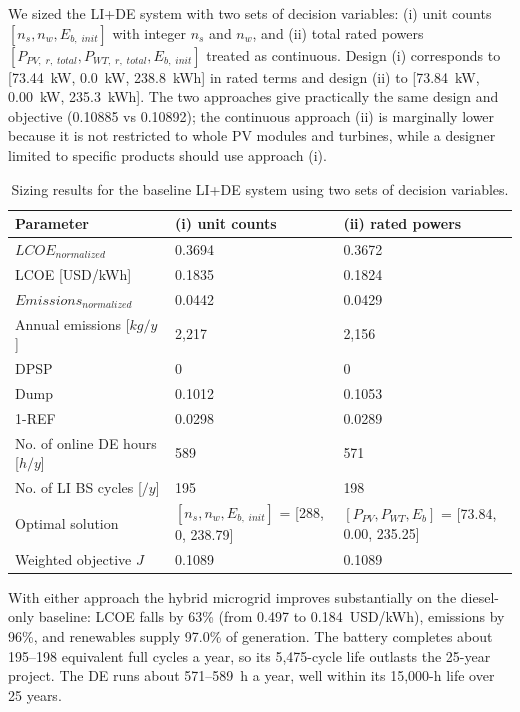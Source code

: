 \documentclass[final,3p,times]{elsarticle}
\begin{document}
We sized the LI+DE system with two sets of decision variables: (i) unit counts $[n_s, n_w, E_{b,\;init}]$ with integer $n_s$ and $n_w$, and (ii) total rated powers $[P_{PV,\;r,\;total}, P_{WT,\;r,\;total}, E_{b,\;init}]$ treated as continuous. Design (i) corresponds to [73.44~kW, 0.0~kW, 238.8~kWh] in rated terms and design (ii) to [73.84~kW, 0.00~kW, 235.3~kWh]. The two approaches give practically the same design and objective (0.10885 vs 0.10892); the continuous approach (ii) is marginally lower because it is not restricted to whole PV modules and turbines, while a designer limited to specific products should use approach (i).

\begin{table}[htbp]
\centering
\begin{tabular}{p{5cm} p{4.3cm} p{4.3cm}}
\toprule
\multicolumn{1}{l}{\textbf{Parameter}} & \multicolumn{1}{l}{(i) unit counts} & \multicolumn{1}{l}{(ii) rated powers} \\
\midrule
$LCOE_{normalized}$ & 0.3694 & 0.3672 \\
LCOE [USD/kWh] & 0.1835 & 0.1824 \\
$Emissions_{normalized}$ & 0.0442 & 0.0429 \\
Annual emissions [$kg/y$] & 2,217 & 2,156 \\
DPSP & 0 & 0 \\
Dump & 0.1012 & 0.1053 \\
1-REF & 0.0298 & 0.0289 \\
No. of online DE hours [$h/y$] & 589 & 571 \\
No. of LI BS cycles [$/y$] & 195 & 198 \\
Optimal solution & $[n_s, n_w, E_{b,\; init}]$ = [288, 0, 238.79] & $[P_{PV}, P_{WT}, E_{b}]$ = [73.84, 0.00, 235.25] \\
Weighted objective $J$ & 0.1089 & 0.1089 \\
\bottomrule
\end{tabular}
\caption{\label{tab:LIDE} Sizing results for the baseline LI+DE system using two sets of decision variables.}
\end{table}

With either approach the hybrid microgrid improves substantially on the diesel-only baseline: LCOE falls by 63\% (from 0.497 to 0.184~USD/kWh), emissions by 96\%, and renewables supply 97.0\% of generation. The battery completes about 195--198 equivalent full cycles a year, so its 5,475-cycle life outlasts the 25-year project. The DE runs about 571--589~h a year, well within its 15,000-h life over 25 years.
\end{document}

